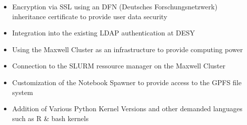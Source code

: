 \documentclass[10pt]{scrartcl}
\begin{document}
\begin{itemize}
 \item Encryption via SSL using an DFN (Deutsches Forschungsnetzwerk) inheritance certificate to provide user data security
 \item Integration into the existing LDAP authentication at DESY
 \item Using the Maxwell Cluster as an infrastructure to provide computing power
 \item Connection to the SLURM ressource manager on the Maxwell Cluster
 \item Customization of the Notebook Spawner to provide access to the GPFS file system
 \item Addition of Various Python Kernel Versions and other demanded languages such as R \& bash kernels
\end{itemize}
%
\end{document}
